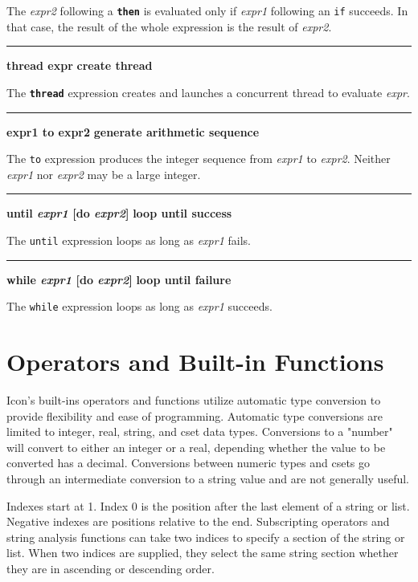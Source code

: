 \noindent
{}The \textit{expr2} following a \texttt{\bf then} is evaluated
only if \textit{expr1} following an \texttt{if} succeeds. In that case,
the result of the whole expression is the result of \textit{expr2}.


\bigskip\hrule\vspace{0.1cm}
\noindent
{\bf thread expr } \hfill {\bf create thread}

\noindent
{}The \texttt{\bf thread} expression creates and launches
a concurrent thread to evaluate \textit{expr}.

\bigskip\hrule\vspace{0.1cm}
\noindent
{\bf expr1 to expr2 } \hfill {\bf generate arithmetic sequence}

\noindent
{}The \texttt{to} expression produces the integer
sequence from \textit{expr1} to \textit{expr2}.
Neither \textit{expr1} nor \textit{expr2} may be a large integer.

\bigskip\hrule\vspace{0.1cm}
\noindent
{\bf \textbf{until} \textit{expr1} [do \textit{expr2}] } \hfill {\bf loop until success}

\noindent
{}The \texttt{until} expression loops as long
as \textit{expr1} fails.

\bigskip\hrule\vspace{0.1cm}
\noindent
{\bf \textbf{while} \textit{expr1} [do \textit{expr2}] } \hfill {\bf loop until failure}

\noindent
{}The \texttt{while} expression loops as long as
\textit{expr1} succeeds.

\section{Operators and Built-in Functions}

Icon's built-ins operators and functions utilize
automatic type conversion to provide flexibility and ease of
programming. Automatic type
conversions are limited to
integer, real, string, and cset data types. Conversions to a "number" will
convert to either an integer or a real, depending whether the value to
be converted has a decimal. Conversions between numeric types and csets
go through an intermediate conversion to a string value and are not
generally useful.

Indexes start at 1. Index 0 is the position after the last element of a
string or list. Negative indexes are positions
relative to the end. Subscripting operators and string analysis
functions can take two indices to specify a section of the string or
list. When two indices are supplied, they select the same string
section whether they are in ascending or descending order.

